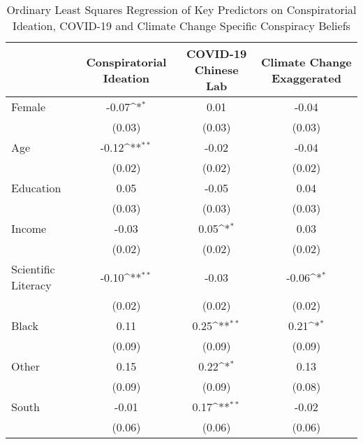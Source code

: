 \begin{table}[htbp]\centering
\def\sym#1{\ifmmode^{#1}\else\(^{#1}\)\fi}
\caption{Ordinary Least Squares Regression of Key Predictors on Conspiratorial Ideation, COVID-19 and Climate Change Specific Conspiracy Beliefs}
\begin{tabular}{l*{3}{c}}
\hline\hline
                    &\multicolumn{1}{c}{Conspiratorial Ideation}&\multicolumn{1}{c}{COVID-19 Chinese Lab}&\multicolumn{1}{c}{Climate Change Exaggerated}\\
\hline
Female              &       -0.07\sym{*} &        0.01        &       -0.04        \\
                    &      (0.03)        &      (0.03)        &      (0.03)        \\
[1em]
Age                 &       -0.12\sym{**}&       -0.02        &       -0.04        \\
                    &      (0.02)        &      (0.02)        &      (0.02)        \\
[1em]
Education           &        0.05        &       -0.05        &        0.04        \\
                    &      (0.03)        &      (0.03)        &      (0.03)        \\
[1em]
Income              &       -0.03        &        0.05\sym{*} &        0.03        \\
                    &      (0.02)        &      (0.02)        &      (0.02)        \\
[1em]
Scientific Literacy &       -0.10\sym{**}&       -0.03        &       -0.06\sym{*} \\
                    &      (0.02)        &      (0.02)        &      (0.02)        \\
[1em]
Black               &        0.11        &        0.25\sym{**}&        0.21\sym{*} \\
                    &      (0.09)        &      (0.09)        &      (0.09)        \\
[1em]
Other               &        0.15        &        0.22\sym{*} &        0.13        \\
                    &      (0.09)        &      (0.09)        &      (0.08)        \\
[1em]
South               &       -0.01        &        0.17\sym{**}&       -0.02        \\
                    &      (0.06)        &      (0.06)        &      (0.06)        \\
[1em]

\end{tabular}
\end{table}
